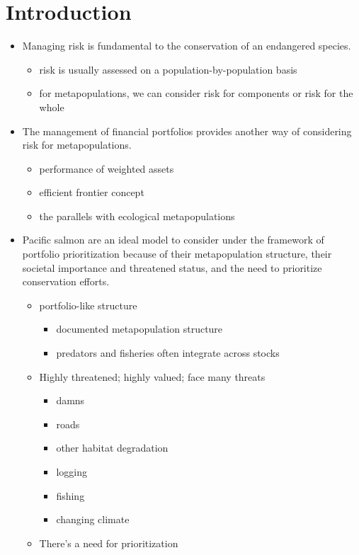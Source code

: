 \section{Introduction}

\begin{itemize}
\itemsep1pt\parskip0pt
\item
  Managing risk is fundamental to the conservation of an endangered species.

  \begin{itemize}
  \itemsep1pt\parskip0pt
  \item
    risk is usually assessed on a population-by-population basis
  \item
    for metapopulations, we can consider risk for components or risk for the whole
  \end{itemize}
\item
  The management of financial portfolios provides another way of considering risk for metapopulations.

  \begin{itemize}
  \itemsep1pt\parskip0pt
  \item
    performance of weighted assets
  \item
    efficient frontier concept
  \item
    the parallels with ecological metapopulations
  \end{itemize}
\item
  Pacific salmon are an ideal model to consider under the framework of portfolio prioritization because of their metapopulation structure, their societal importance and threatened status, and the need to prioritize conservation efforts.

  \begin{itemize}
  \itemsep1pt\parskip0pt
  \item
    portfolio-like structure

    \begin{itemize}
    \itemsep1pt\parskip0pt
    \item
      documented metapopulation structure
    \item
      predators and fisheries often integrate across stocks
    \end{itemize}
  \item
    Highly threatened; highly valued; face many threats

    \begin{itemize}
    \itemsep1pt\parskip0pt
    \item
      damns
    \item
      roads
    \item
      other habitat degradation
    \item
      logging
    \item
      fishing
    \item
      changing climate
    \end{itemize}
  \item
    There's a need for prioritization


\end{itemize}
\end{itemize}
